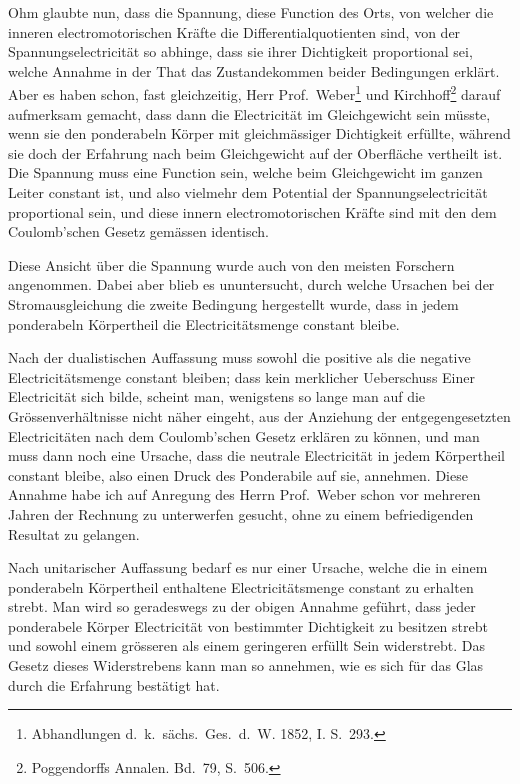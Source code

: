 \documentclass[12pt,a4paper]{article}
\begin{document}
Ohm glaubte nun, dass die Spannung, diese Function des Orts, von welcher die inneren electromotorischen Kräfte die Differentialquotienten sind, von der Spannungselectricität so abhinge, dass sie ihrer Dichtigkeit proportional sei, welche Annahme in der That das Zustandekommen beider Bedingungen erklärt. Aber es haben schon, fast gleichzeitig, Herr Prof.~Weber\footnote{Abhandlungen d.\ k.\ sächs.\ Ges.\ d.\ W. 1852, I. S.~293.} und Kirchhoff\footnote{Poggendorffs Annalen. Bd.~79, S.~506.} darauf aufmerksam gemacht, dass dann die Electricität im Gleichgewicht sein müsste, wenn sie den ponderabeln Körper mit gleichmässiger Dichtigkeit erfüllte, während sie doch der Erfahrung nach beim Gleichgewicht auf der Oberfläche vertheilt ist. Die Spannung muss eine Function sein, welche beim Gleichgewicht im ganzen Leiter constant ist, und also vielmehr dem Potential der Spannungselectricität proportional sein, und diese innern electromotorischen Kräfte sind mit den dem Coulomb'schen Gesetz gemässen identisch.

Diese Ansicht über die Spannung wurde auch von den meisten Forschern angenommen. Dabei aber blieb es ununtersucht, durch welche Ursachen bei der Stromausgleichung die zweite Bedingung hergestellt wurde, dass in jedem ponderabeln Körpertheil die Electricitätsmenge constant bleibe.

Nach der dualistischen Auffassung muss sowohl die positive als die negative Electricitätsmenge constant bleiben; dass kein merklicher Ueberschuss Einer Electricität sich bilde, scheint man, wenigstens so lange man auf die Grössenverhältnisse nicht näher eingeht, aus der Anziehung der entgegengesetzten Electricitäten nach dem Coulomb'schen Gesetz erklären zu können, und man muss dann noch eine Ursache, dass die neutrale Electricität in jedem Körpertheil constant bleibe, also einen Druck des Ponderabile auf sie, annehmen. Diese Annahme habe ich auf Anregung des Herrn Prof.~Weber schon vor mehreren Jahren der Rechnung zu unterwerfen gesucht, ohne zu einem befriedigenden Resultat zu gelangen.

Nach unitarischer Auffassung bedarf es nur einer Ursache, welche die in einem ponderabeln Körpertheil enthaltene Electricitätsmenge constant zu erhalten strebt. Man wird so geradeswegs zu der obigen Annahme geführt, dass jeder ponderabele Körper Electricität von bestimmter Dichtigkeit zu besitzen strebt und sowohl einem grösseren als einem geringeren erfüllt Sein widerstrebt. Das Gesetz dieses Widerstrebens kann man so annehmen, wie es sich für das Glas durch die Erfahrung bestätigt hat.
\end{document}
